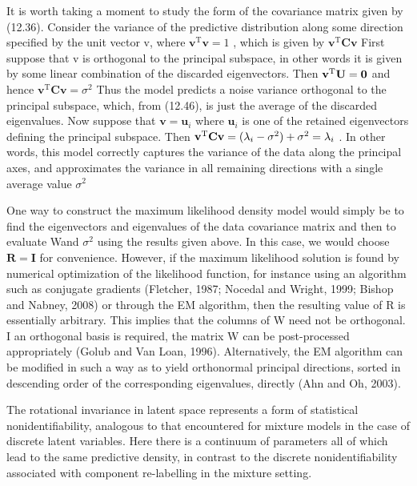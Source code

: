 \documentclass[
  10
]{article}
\begin{document}
It is worth taking a moment to study the form of the covariance matrix
given by (12.36). Consider the variance of the predictive distribution
along some direction specified by the unit vector v, where
\(\mathbf { v } ^ { \mathrm { T } } \mathbf { v } = 1\) , which is given
by \(\mathbf { v } ^ { \mathrm { T } } \mathbf { C } \mathbf { v }\)
First suppose that v is orthogonal to the principal subspace, in other
words it is given by some linear combination of the discarded
eigenvectors. Then
\({ \bf { v } } ^ { \mathrm { { T } } } { \bf { U } } = { \bf { 0 } }\)
and hence
\(\mathbf { v } ^ { \mathrm { { T } } } \mathbf { C } \mathbf { v } = \sigma ^ { 2 }\)
Thus the model predicts a noise variance orthogonal to the principal
subspace, which, from (12.46), is just the average of the discarded
eigenvalues. Now suppose that \(\mathbf { v } = \mathbf { u } _ { i }\)
where \(\mathbf { u } _ { i }\) is one of the retained eigenvectors
defining the principal subspace. Then
\({ \bf v } ^ { \mathrm { T } } { \bf C } { \bf v } = ( \lambda _ { i } - \sigma ^ { 2 } ) + \sigma ^ { 2 } = \lambda _ { i }\)
. In other words, this model correctly captures the variance of the data
along the principal axes, and approximates the variance in all remaining
directions with a single average value \(\sigma ^ { 2 }\)

One way to construct the maximum likelihood density model would simply
be to find the eigenvectors and eigenvalues of the data covariance
matrix and then to evaluate Wand \(\sigma ^ { 2 }\) using the results
given above. In this case, we would choose
\(\mathbf { R } = \mathbf { I }\) for convenience. However, if the
maximum likelihood solution is found by numerical optimization of the
likelihood function, for instance using an algorithm such as conjugate
gradients (Fletcher, 1987; Nocedal and Wright, 1999; Bishop and Nabney,
2008) or through the EM algorithm, then the resulting value of R is
essentially arbitrary. This implies that the columns of W need not be
orthogonal. I an orthogonal basis is required, the matrix W can be
post-processed appropriately (Golub and Van Loan, 1996). Alternatively,
the EM algorithm can be modified in such a way as to yield orthonormal
principal directions, sorted in descending order of the corresponding
eigenvalues, directly (Ahn and Oh, 2003).

The rotational invariance in latent space represents a form of
statistical nonidentifiability, analogous to that encountered for
mixture models in the case of discrete latent variables. Here there is a
continuum of parameters all of which lead to the same predictive
density, in contrast to the discrete nonidentifiability associated with
component re-labelling in the mixture setting.
\end{document}
